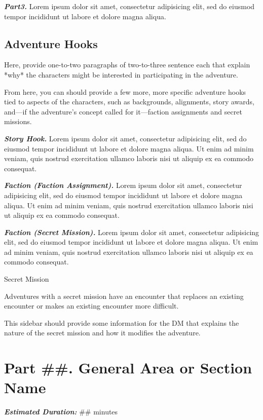\emph{\textbf{Part3.}} Lorem ipsum dolor sit amet, consectetur
adipisicing elit, sed do eiusmod tempor incididunt ut labore et dolore
magna aliqua.

\subsection{Adventure Hooks}\label{adventure-hooks}

Here, provide one-to-two paragraphs of two-to-three sentence each that
explain *why* the characters might be interested in participating in the
adventure.

From here, you can should provide a few more, more specific adventure
hooks tied to aspects of the characters, such as backgrounds,
alignments, story awards, and---if the adventure's concept called for
it---faction assignments and secret missions.

\emph{\textbf{Story Hook.}} Lorem ipsum dolor sit amet, consectetur
adipisicing elit, sed do eiusmod tempor incididunt ut labore et dolore
magna aliqua. Ut enim ad minim veniam, quis nostrud exercitation ullamco
laboris nisi ut aliquip ex ea commodo consequat.

\emph{\textbf{Faction (Faction Assignment).}} Lorem ipsum dolor sit
amet, consectetur adipisicing elit, sed do eiusmod tempor incididunt ut
labore et dolore magna aliqua. Ut enim ad minim veniam, quis nostrud
exercitation ullamco laboris nisi ut aliquip ex ea commodo consequat.

\emph{\textbf{Faction (Secret Mission).}} Lorem ipsum dolor sit amet,
consectetur adipisicing elit, sed do eiusmod tempor incididunt ut labore
et dolore magna aliqua. Ut enim ad minim veniam, quis nostrud
exercitation ullamco laboris nisi ut aliquip ex ea commodo consequat.

Secret Mission

Adventures with a secret mission have an encounter that replaces an
existing encounter or makes an existing encounter more difficult.

This sidebar should provide some information for the DM that explains
the nature of the secret mission and how it modifies the adventure.

\section{Part \#\#. General Area or Section
Name}\label{part-.-general-area-or-section-name}

\emph{\textbf{Estimated Duration:}} \#\# minutes

